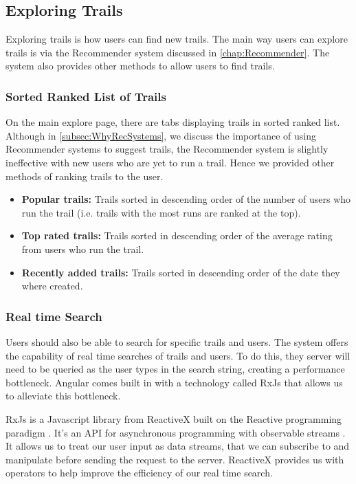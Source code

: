 \subsection{Exploring Trails}
Exploring trails is how users can find new trails. The main way users can explore trails is via the Recommender system discussed in \autoref{chap:Recommender}. The system also provides other methods to allow users to find trails.

\subsubsection{Sorted Ranked List of Trails}
On the main explore page, there are tabs displaying trails in sorted ranked list. Although in \autoref{subsec:WhyRecSystems}, we discuss the importance of using Recommender systems to suggest trails, the Recommender system is slightly ineffective with new users who are yet to run a trail. Hence we provided other methods of ranking trails to the user.

\begin{itemize}
    \item \textbf{Popular trails:} Trails sorted in descending order of the number of users who run the trail (i.e. trails with the most runs are ranked at the top). 
    \item \textbf{Top rated trails:} Trails sorted in descending order of the average rating from users who run the trail.
    \item \textbf{Recently added trails:} Trails sorted in descending order of the date they where created.
\end{itemize}

\subsubsection{Real time Search}
Users should also be able to search for specific trails and users. The system offers the capability of real time searches of trails and users. To do this, they server will need to be queried as the user types in the search string, creating a performance bottleneck. Angular comes built in with a technology called RxJs that allows us to alleviate this bottleneck.

RxJs is a Javascript library from ReactiveX built on the Reactive programming paradigm \cite{wan2000functional}. It's an API for asynchronous programming with observable streams \cite{reactivex2018main}. It allows us to treat our user input as data streams, that we can subscribe to and manipulate before sending the request to the server. ReactiveX provides us with operators to help improve the efficiency of our real time search.

